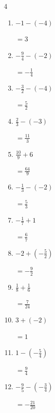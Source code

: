 \begin{multicols}{4}
\begin{enumerate}
        $\displaystyle =-1$

  \item $\displaystyle -1 - \left(-4\right)$

        $\displaystyle =3$

  \item $\displaystyle -\frac{9}{4} - \left(-2\right)$

        $\displaystyle =-\frac{1}{4}$

\columnbreak %

  \item $\displaystyle -\frac{3}{2} - \left(-4\right)$

        $\displaystyle =\frac{5}{2}$

  \item $\displaystyle \frac{2}{3} - \left(-3\right)$

        $\displaystyle =\frac{11}{3}$

  \item $\displaystyle \frac{10}{9} + 6$

        $\displaystyle =\frac{64}{9}$

  \item $\displaystyle -\frac{1}{3} - \left(-2\right)$

        $\displaystyle =\frac{5}{3}$

  \item $\displaystyle -\frac{1}{7} + 1$

        $\displaystyle =\frac{6}{7}$

  \item $\displaystyle -2 + \left(-\frac{5}{2}\right)$

        $\displaystyle =-\frac{9}{2}$

  \item $\displaystyle \frac{1}{8} + \frac{1}{6}$

        $\displaystyle =\frac{7}{24}$

  \item $\displaystyle 3 + \left(-2\right)$

        $\displaystyle =1$

  \item $\displaystyle 1 - \left(-\frac{5}{4}\right)$

        $\displaystyle =\frac{9}{4}$

  \item $\displaystyle -\frac{9}{5} - \left(-\frac{3}{4}\right)$

        $\displaystyle =-\frac{21}{20}$


\end{enumerate}
\end{multicols}
